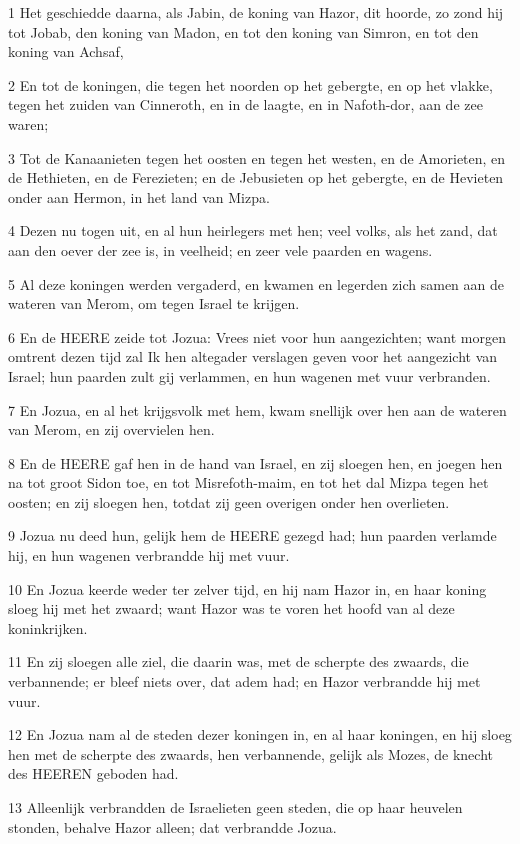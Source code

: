 \par 1 Het geschiedde daarna, als Jabin, de koning van Hazor, dit hoorde, zo zond hij tot Jobab, den koning van Madon, en tot den koning van Simron, en tot den koning van Achsaf,
\par 2 En tot de koningen, die tegen het noorden op het gebergte, en op het vlakke, tegen het zuiden van Cinneroth, en in de laagte, en in Nafoth-dor, aan de zee waren;
\par 3 Tot de Kanaanieten tegen het oosten en tegen het westen, en de Amorieten, en de Hethieten, en de Ferezieten; en de Jebusieten op het gebergte, en de Hevieten onder aan Hermon, in het land van Mizpa.
\par 4 Dezen nu togen uit, en al hun heirlegers met hen; veel volks, als het zand, dat aan den oever der zee is, in veelheid; en zeer vele paarden en wagens.
\par 5 Al deze koningen werden vergaderd, en kwamen en legerden zich samen aan de wateren van Merom, om tegen Israel te krijgen.
\par 6 En de HEERE zeide tot Jozua: Vrees niet voor hun aangezichten; want morgen omtrent dezen tijd zal Ik hen altegader verslagen geven voor het aangezicht van Israel; hun paarden zult gij verlammen, en hun wagenen met vuur verbranden.
\par 7 En Jozua, en al het krijgsvolk met hem, kwam snellijk over hen aan de wateren van Merom, en zij overvielen hen.
\par 8 En de HEERE gaf hen in de hand van Israel, en zij sloegen hen, en joegen hen na tot groot Sidon toe, en tot Misrefoth-maim, en tot het dal Mizpa tegen het oosten; en zij sloegen hen, totdat zij geen overigen onder hen overlieten.
\par 9 Jozua nu deed hun, gelijk hem de HEERE gezegd had; hun paarden verlamde hij, en hun wagenen verbrandde hij met vuur.
\par 10 En Jozua keerde weder ter zelver tijd, en hij nam Hazor in, en haar koning sloeg hij met het zwaard; want Hazor was te voren het hoofd van al deze koninkrijken.
\par 11 En zij sloegen alle ziel, die daarin was, met de scherpte des zwaards, die verbannende; er bleef niets over, dat adem had; en Hazor verbrandde hij met vuur.
\par 12 En Jozua nam al de steden dezer koningen in, en al haar koningen, en hij sloeg hen met de scherpte des zwaards, hen verbannende, gelijk als Mozes, de knecht des HEEREN geboden had.
\par 13 Alleenlijk verbrandden de Israelieten geen steden, die op haar heuvelen stonden, behalve Hazor alleen; dat verbrandde Jozua.
